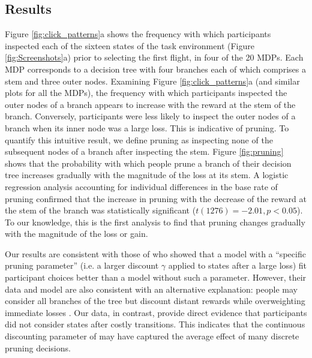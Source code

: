 \documentclass[11pt]{article} %
\newcommand{\fl}[1]{\textcolor{red}{\textsc{[#1 -Falk]}}}
\begin{document}
\subsection{Results}



Figure \ref{fig:click_patterns}a shows the frequency with which participants inspected each of the sixteen states of the task environment (Figure \ref{fig:Screenshots}a) prior to selecting the first flight, in four of the 20 MDPs. Each MDP corresponds to a decision tree with four branches each of which comprises a stem and three outer nodes. Examining Figure \ref{fig:click_patterns}a (and similar plots for all the MDPs), the frequency with which participants inspected the outer nodes of a branch appears to increase with the reward at the stem of the branch. Conversely, participants were less likely to inspect the outer nodes of a branch when its inner node was a large loss. This is indicative of pruning. To quantify this intuitive result, we define pruning as inspecting none of the subsequent nodes of a branch after inspecting the stem. Figure \ref{fig:pruning} shows that the probability with which people prune a branch of their decision tree increases gradually with the magnitude of the loss at its stem. A logistic regression analysis accounting for individual differences in the base rate of pruning confirmed that the increase in pruning with the decrease of the reward at the stem of the branch was statistically significant ($t(1276)=-2.01,p<0.05$). To our knowledge, this is the first analysis to find that pruning changes gradually with the magnitude of the loss or gain.

Our results are consistent with those of  who showed that a model with a ``specific pruning parameter'' (i.e. a larger discount $\gamma$ applied to states after a large loss) fit participant choices better than a model without such a parameter.
However, their data and model are also consistent with an alternative explanation: people may consider all branches of the tree but discount distant rewards while overweighting immediate losses \cite{Green2004}.
Our data, in contrast, provide direct evidence that participants did not consider states after costly transitions.
This indicates that the continuous discounting parameter of  may have captured the average effect of many discrete pruning decisions.
\end{document}

